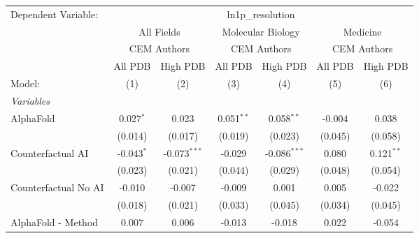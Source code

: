 \begingroup
\centering
\begin{tabular}{lcccccc}
   \tabularnewline \midrule \midrule
   Dependent Variable: & \multicolumn{6}{c}{ln1p\_resolution}\\
 & \multicolumn{2}{c}{All Fields} & \multicolumn{2}{c}{Molecular Biology} & \multicolumn{2}{c}{Medicine} \\
\cmidrule(lr){2-3} \cmidrule(lr){4-5} \cmidrule(lr){6-7}
 & \multicolumn{2}{c}{CEM Authors} & \multicolumn{2}{c}{CEM Authors} & \multicolumn{2}{c}{CEM Authors} \\
\cmidrule(lr){2-3} \cmidrule(lr){4-5} \cmidrule(lr){6-7}
 & \multicolumn{1}{c}{All PDB} & \multicolumn{1}{c}{High PDB} & \multicolumn{1}{c}{All PDB} & \multicolumn{1}{c}{High PDB} & \multicolumn{1}{c}{All PDB} & \multicolumn{1}{c}{High PDB} \\
\cmidrule(lr){2-2} \cmidrule(lr){3-3} \cmidrule(lr){4-4} \cmidrule(lr){5-5} \cmidrule(lr){6-6} \cmidrule(lr){7-7}
   Model:                                                     & (1)           & (2)            & (3)           & (4)            & (5)          & (6)\\  
   \midrule
   \emph{Variables}\\
   AlphaFold                                                  & 0.027$^{*}$   & 0.023          & 0.051$^{**}$  & 0.058$^{**}$   & -0.004       & 0.038\\   
                                                              & (0.014)       & (0.017)        & (0.019)       & (0.023)        & (0.045)      & (0.058)\\   
   Counterfactual AI                                          & -0.043$^{*}$  & -0.073$^{***}$ & -0.029        & -0.086$^{***}$ & 0.080        & 0.121$^{**}$\\   
                                                              & (0.023)       & (0.021)        & (0.044)       & (0.029)        & (0.048)      & (0.054)\\   
   Counterfactual No AI                                       & -0.010        & -0.007         & -0.009        & 0.001          & 0.005        & -0.022\\   
                                                              & (0.018)       & (0.021)        & (0.033)       & (0.045)        & (0.034)      & (0.045)\\   
   AlphaFold - Method                                         & 0.007         & 0.006          & -0.013        & -0.018         & 0.022        & -0.054\\   

\end{tabular}
